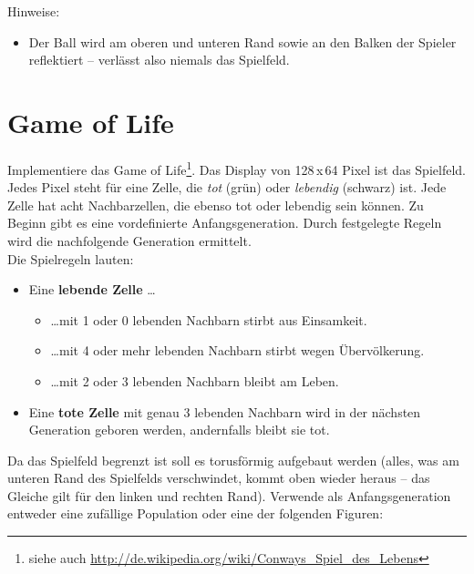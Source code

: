Hinweise:
\begin{itemize}
\item Der Ball wird am oberen und unteren Rand sowie an den Balken der Spieler \glqq{}reflektiert\grqq{} -- verlässt also niemals das Spielfeld.
\end{itemize}

\section{Game of Life}

Implementiere das \glqq{}Game of Life\grqq{}\footnote{siehe auch \url{http://de.wikipedia.org/wiki/Conways_Spiel_des_Lebens}}.
Das Display von 128\,x\,64 Pixel ist das Spielfeld.
Jedes Pixel steht für eine Zelle, die \textit{tot} (grün) oder \textit{lebendig} (schwarz) ist.
Jede Zelle hat acht Nachbarzellen, die ebenso tot oder lebendig sein können.
Zu Beginn gibt es eine vordefinierte Anfangsgeneration.
Durch festgelegte Regeln wird die nachfolgende Generation ermittelt.\\
Die Spielregeln lauten:
\begin{itemize}
\item Eine \textbf{lebende Zelle} \dots
\begin{itemize}
\item \dots mit 1 oder 0 lebenden Nachbarn stirbt aus Einsamkeit.
\item \dots mit 4 oder mehr lebenden Nachbarn stirbt wegen Übervölkerung.
\item \dots mit 2 oder 3 lebenden Nachbarn bleibt am Leben.
\end{itemize}
\item Eine \textbf{tote Zelle} mit genau 3 lebenden Nachbarn wird in der nächsten Generation geboren werden, andernfalls bleibt sie tot.
\end{itemize}
Da das Spielfeld begrenzt ist soll es torusförmig aufgebaut werden (alles, was am unteren Rand des Spielfelds verschwindet, kommt oben wieder heraus -- das Gleiche gilt für den linken und rechten Rand). 
Verwende als Anfangsgeneration entweder eine zufällige Population oder eine der folgenden Figuren:
